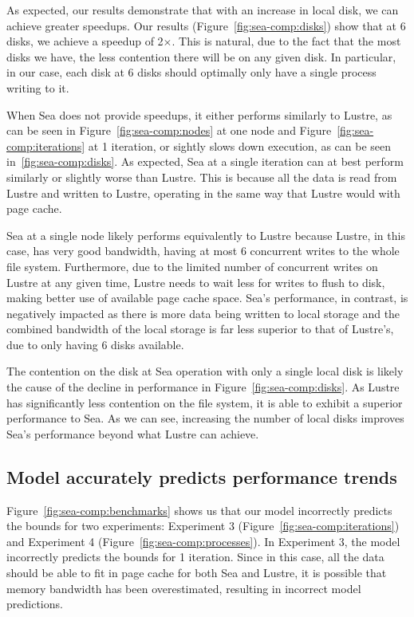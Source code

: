       As expected, our results demonstrate that with an increase in local disk,
      we can achieve greater speedups. Our results
      (Figure~\ref{fig:sea-comp:disks}) show that at 6 disks, we achieve a
      speedup of 2$\times$. This is natural, due to the fact that the most disks
      we have, the less contention there will be on any given disk. In
      particular, in our case, each disk at 6 disks should optimally only have a
      single process writing to it.

      When Sea does not provide speedups, it either performs similarly to
      Lustre, as can be seen in Figure~\ref{fig:sea-comp:nodes} at one node and
      Figure~\ref{fig:sea-comp:iterations} at 1 iteration, or sightly slows down
      execution, as can be seen in~\ref{fig:sea-comp:disks}. As expected, Sea at
      a single iteration can at best perform similarly or slightly worse than
      Lustre. This is because all the data is read from Lustre and written to
      Lustre, operating in the same way that Lustre would with page cache.

      Sea at a single node likely performs equivalently to Lustre because
      Lustre, in this case, has very good bandwidth, having at most 6 concurrent
      writes to the whole file system. Furthermore, due to the limited number of
      concurrent writes on Lustre at any given time, Lustre needs to wait less
      for writes to flush to disk, making better use of available page cache
      space. Sea's performance, in contrast, is negatively impacted as there is
      more data being written to local storage and the combined bandwidth of the
      local storage is far less superior to that of Lustre's, due to only having
      6 disks available.

      The contention on the disk at Sea operation with only a single local disk
      is likely the cause of the decline in performance in
      Figure~\ref{fig:sea-comp:disks}. As Lustre has significantly less
      contention on the file system, it is able to exhibit a superior
      performance to Sea. As we can see, increasing the number of local disks
      improves Sea's performance beyond what Lustre can achieve.
    

      \subsection{Model accurately predicts performance trends}

      Figure~\ref{fig:sea-comp:benchmarks} shows us that our model incorrectly
      predicts the bounds for two experiments: Experiment 3
      (Figure~\ref{fig:sea-comp:iterations}) and Experiment 4
      (Figure~\ref{fig:sea-comp:processes}). In Experiment 3, the model
      incorrectly predicts the bounds for 1 iteration. Since in this case, all
      the data should be able to fit in page cache for both Sea and Lustre, it
      is possible that memory bandwidth has been overestimated, resulting in
      incorrect model predictions.

